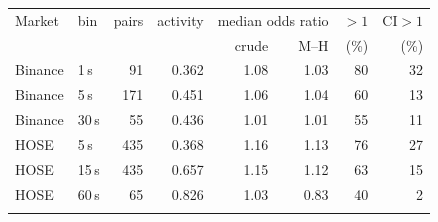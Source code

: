 \begin{tabular}{@{}llrrrrrr@{}}
\toprule
Market & bin & pairs & activity & \multicolumn{2}{c}{median odds ratio} & $>1$ & CI$>1$ \\
 & & & & crude & M--H & (\%) & (\%) \\
\colrule
Binance & 1\,s & 91 & 0.362 & 1.08 & 1.03 & 80 & 32 \\
Binance & 5\,s & 171 & 0.451 & 1.06 & 1.04 & 60 & 13 \\
Binance & 30\,s & 55 & 0.436 & 1.01 & 1.01 & 55 & 11 \\
HOSE & 5\,s & 435 & 0.368 & 1.16 & 1.13 & 76 & 27 \\
HOSE & 15\,s & 435 & 0.657 & 1.15 & 1.12 & 63 & 15 \\
HOSE & 60\,s & 65 & 0.826 & 1.03 & 0.83 & 40 & 2 \\
\botrule
\end{tabular}